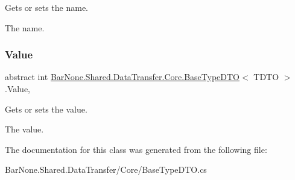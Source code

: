 Gets or sets the name. 

The name. \mbox{\label{class_bar_none_1_1_shared_1_1_data_transfer_1_1_core_1_1_base_type_d_t_o_a7225dc6b32f827ac7386b89d7ee645b1}} 
\subsubsection{\texorpdfstring{Value}{Value}}
{\footnotesize\ttfamily abstract int \mbox{\hyperlink{class_bar_none_1_1_shared_1_1_data_transfer_1_1_core_1_1_base_type_d_t_o}{Bar\+None.\+Shared.\+Data\+Transfer.\+Core.\+Base\+Type\+D\+TO}}$<$ T\+D\+TO $>$.Value\hspace{0.3cm}{\ttfamily [get]}, {\ttfamily [set]}}



Gets or sets the value. 

The value. 

The documentation for this class was generated from the following file\+:\begin{DoxyCompactItemize}
\item 
Bar\+None.\+Shared.\+Data\+Transfer/\+Core/Base\+Type\+D\+T\+O.\+cs\end{DoxyCompactItemize}
